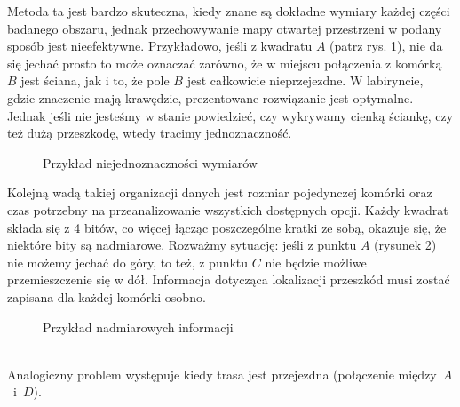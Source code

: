             Metoda ta jest bardzo skuteczna, kiedy znane są dokładne wymiary każdej części badanego obszaru,
            jednak przechowywanie mapy otwartej przestrzeni w podany sposób jest nieefektywne.
            Przykładowo, jeśli z kwadratu $A$ (patrz rys. \ref{fig:dim_issue}), nie da się jechać prosto to może oznaczać zarówno, że w miejscu połączenia z komórką $B$ jest ściana, jak i to, że pole $B$ jest całkowicie nieprzejezdne.
            W labiryncie, gdzie znaczenie mają krawędzie, prezentowane rozwiązanie jest optymalne.
            Jednak jeśli nie jesteśmy w stanie powiedzieć, czy wykrywamy cienką ściankę, czy też dużą przeszkodę, wtedy tracimy jednoznaczność.

            \begin{figure}[!ht]
                \centering
                \caption{Przykład niejednoznaczności wymiarów}
                \label{fig:dim_issue}
            \end{figure}

            Kolejną wadą takiej organizacji danych jest rozmiar pojedynczej komórki oraz czas potrzebny na przeanalizowanie wszystkich dostępnych opcji.
            Każdy kwadrat składa się z 4 bitów,
            co więcej łącząc poszczególne kratki ze sobą, okazuje się, że niektóre bity są nadmiarowe.
            Rozważmy sytuację: jeśli z punktu $A$ (rysunek \ref{fig:bit_issue}) nie możemy jechać do góry, to też, z punktu $C$ nie będzie możliwe przemieszczenie się w dół.
            Informacja dotycząca lokalizacji przeszkód musi zostać zapisana dla każdej komórki osobno.
            \begin{figure}[!ht]
                \centering
                \caption{Przykład nadmiarowych informacji}
                \label{fig:bit_issue}
            \end{figure}\\
            Analogiczny problem występuje kiedy trasa jest przejezdna (połączenie między~$A$~i~$D$).

